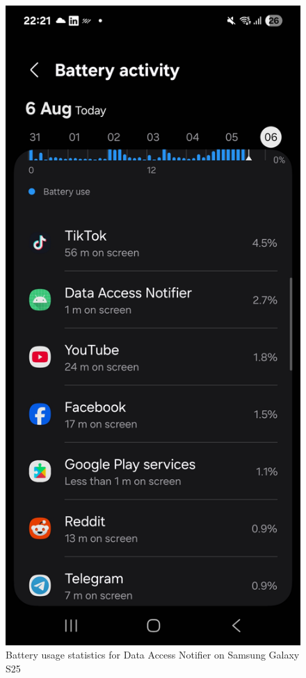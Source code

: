 \begin{figure}[H]
\begin{minipage}{0.32\textwidth}
\end{minipage}%
\hfill
\begin{minipage}{0.32\textwidth}
    \centering
    \includegraphics[width=\textwidth]{english/figures/IMG_20250809_225839_295.jpg}
\end{minipage}
\caption{Battery usage statistics for Data Access Notifier on Samsung Galaxy S25}
\label{fig:battery-usage}
\end{figure}

